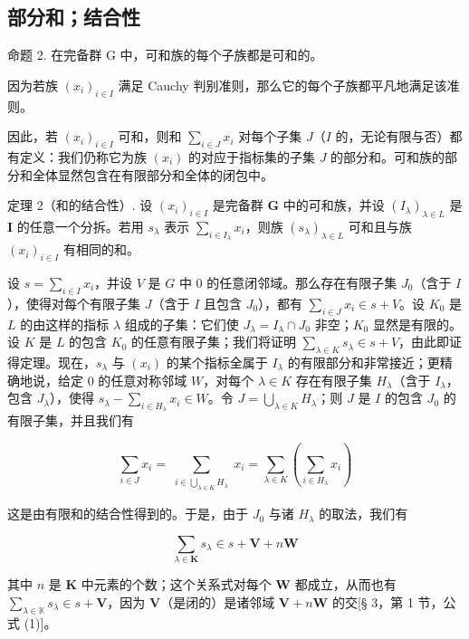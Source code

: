 \subsection{部分和；结合性}

命题 2. 在完备群 G 中，可和族的每个子族都是可和的。

因为若族 \((x_{i})_{i\in I}\) 满足 Cauchy 判别准则，那么它的每个子族都平凡地满足该准则。

因此，若 \((x_{i})_{i\in I}\) 可和，则和 \(\sum_{i\in J}x_{i}\) 对每个子集 \(J\)（\(I\) 的，无论有限与否）都有定义：我们仍称它为族 \((x_{i})\) 的对应于指标集的子集 \(J\) 的部分和。可和族的部分和全体显然包含在有限部分和全体的闭包中。

定理 2（和的结合性）. 设 \((x_{i})_{i\in I}\) 是完备群 \(\mathbf{G}\) 中的可和族，并设 \((I_{\lambda})_{\lambda \in L}\) 是 \(\mathbf{I}\) 的任意一个分拆。若用 \(s_{\lambda}\) 表示 \(\sum_{i\in I_{\lambda}}x_{i}\)，则族 \((s_{\lambda})_{\lambda \in L}\) 可和且与族 \((x_{i})_{i\in I}\) 有相同的和。

设 \(s = \sum_{i \in I} x_i\)，并设 \(V\) 是 \(G\) 中 0 的任意闭邻域。那么存在有限子集 \(J_0\)（含于 \(I\)），使得对每个有限子集 \(J\)（含于 \(I\) 且包含 \(J_0\)），都有 \(\sum_{i \in J} x_i \in s + V\)。设 \(K_0\) 是 \(L\) 的由这样的指标 \(\lambda\) 组成的子集：它们使 \(J_\lambda = I_\lambda \cap J_0\) 非空；\(K_0\) 显然是有限的。设 \(K\) 是 \(L\) 的包含 \(K_0\) 的任意有限子集；我们将证明 \(\sum_{\lambda \in K} s_\lambda \in s + V\)，由此即证得定理。现在，\(s_\lambda\) 与 \((x_i)\) 的某个指标全属于 \(I_\lambda\) 的有限部分和非常接近；更精确地说，给定 0 的任意对称邻域 \(W\)，对每个 \(\lambda \in K\) 存在有限子集 \(H_\lambda\)（含于 \(I_\lambda\)，包含 \(J_\lambda\)），使得 \(s_\lambda - \sum_{i \in H_\lambda} x_i \in W\)。令 \(J = \bigcup_{\lambda \in K} H_\lambda\)；则 \(J\) 是 \(I\) 的包含 \(J_0\) 的有限子集，并且我们有

\[
\sum_ {i \in J} x _ {i} = \sum_ {\substack {i \in \bigcup_ {\lambda \in K} H _ {\lambda}}} x _ {i} = \sum_ {\lambda \in K} (\sum_ {i \in H _ {\lambda}} x _ {i})
\]

这是由有限和的结合性得到的。于是，由于 \(J_{0}\) 与诸 \(H_{\lambda}\) 的取法，我们有

\[
\sum_ {\lambda \in \mathbf {K}} s _ {\lambda} \in s + \mathbf {V} + n \mathbf {W}
\]

其中 \(n\) 是 \(\mathbf{K}\) 中元素的个数；这个关系式对每个 \(\mathbf{W}\) 都成立，从而也有 \(\sum_{\lambda \in \mathbb{K}} s_{\lambda} \in s + \mathbf{V}\)，因为 \(\mathbf{V}\)（是闭的）是诸邻域 \(\mathbf{V} + n\mathbf{W}\) 的交{[}§ 3，第 1 节，公式 (1){]}。

